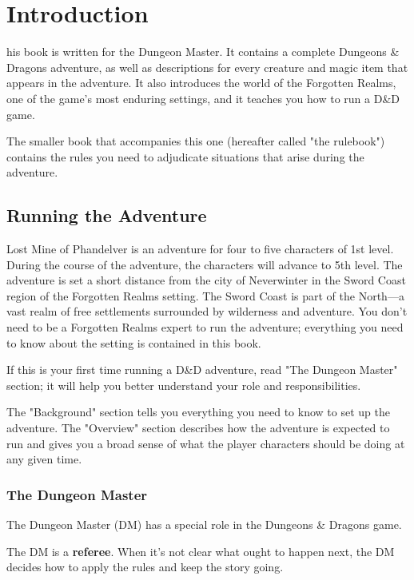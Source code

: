 \documentclass[10pt,a4paper,twoside,bg=print,twocolumn,openany,nodeprecatedcode]{dndbook}
\date{}
\begin{document}
\frontmatter
\tableofcontents
\mainmatter
{}
\chapter*{Introduction}
his book is written for the Dungeon Master. It contains a complete Dungeons \& Dragons adventure, as well as descriptions for every creature and magic item that appears in the adventure. It also introduces the world of the Forgotten Realms, one of the game's most enduring settings, and it teaches you how to run a D\&D game.


The smaller book that accompanies this one (hereafter called "the rulebook") contains the rules you need to adjudicate situations that arise during the adventure.

\section{Running the Adventure}
Lost Mine of Phandelver is an adventure for four to five characters of 1st level. During the course of the adventure, the characters will advance to 5th level. The adventure is set a short distance from the city of Neverwinter in the Sword Coast region of the Forgotten Realms setting. The Sword Coast is part of the North—a vast realm of free settlements surrounded by wilderness and adventure. You don't need to be a Forgotten Realms expert to run the adventure; everything you need to know about the setting is contained in this book.

If this is your first time running a D\&D adventure, read "The Dungeon Master" section; it will help you better understand your role and responsibilities.

The "Background" section tells you everything you need to know to set up the adventure. The "Overview" section describes how the adventure is expected to run and gives you a broad sense of what the player characters should be doing at any given time.

\subsection{The Dungeon Master}
The Dungeon Master (DM) has a special role in the Dungeons \& Dragons game.

The DM is a \textbf{referee}. When it's not clear what ought to happen next, the DM decides how to apply the rules and keep the story going.
\end{document}
